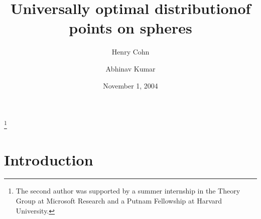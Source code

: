 \documentclass{jams-l}
\theoremstyle{plain}
\numberwithin{theorem}{section}
\theoremstyle{definition}
\numberwithin{equation}{section}
\begin{document}
\title{Universally optimal distribution\linebreak[1] of points on spheres}
\author{Henry Cohn}
\address{Microsoft Research,
One Microsoft Way,
Redmond, Washington 98052-6399}
\author{Abhinav Kumar}
\address{Department of Mathematics,
Harvard University,
Cambridge, Massachusetts 02138}
\thanks{The second author was supported by a summer internship
in the Theory Group at Microsoft Research and a Putnam Fellowship
at Harvard University.}
\date{November 1, 2004}


\maketitle
\tableofcontents


\section{Introduction} \label{sec:intro}
\end{document}
